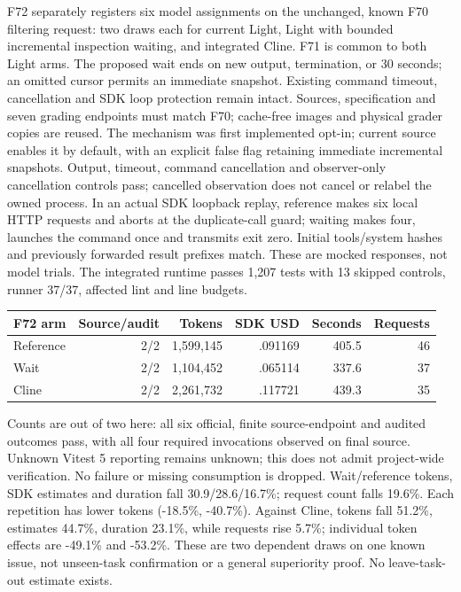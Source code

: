 \documentclass[11pt,a4paper]{article}
\begin{document}
F72 separately registers six model assignments on the unchanged, known F70
filtering request: two draws each for current Light, Light with bounded incremental
inspection waiting, and integrated Cline. F71 is common to both Light arms.
The proposed wait ends on new output, termination, or 30 seconds; an omitted
cursor permits an immediate snapshot. Existing command timeout, cancellation and
SDK loop protection remain intact. Sources, specification and seven grading
endpoints must match F70; cache-free images and physical grader copies are reused.
The mechanism was first implemented opt-in; current source enables it by default,
with an explicit false flag retaining immediate incremental snapshots. Output,
timeout, command cancellation and
observer-only cancellation controls pass; cancelled observation does not cancel
or relabel the owned process. In an actual SDK loopback replay, reference makes
six local HTTP requests and aborts at the duplicate-call guard; waiting makes
four, launches the command once and transmits exit zero. Initial tools/system
hashes and previously forwarded result prefixes match. These are mocked responses,
not model trials. The integrated runtime passes 1,207 tests with 13 skipped controls,
runner 37/37, affected lint and line budgets.
\begin{center}\small
\begin{tabular}{lrrrrr}\toprule
F72 arm & Source/audit & Tokens & SDK USD & Seconds & Requests \\\midrule
Reference & 2/2 & 1,599,145 & .091169 & 405.5 & 46 \\
Wait & 2/2 & 1,104,452 & .065114 & 337.6 & 37 \\
Cline & 2/2 & 2,261,732 & .117721 & 439.3 & 35 \\\bottomrule
\end{tabular}\end{center}
Counts are out of two here: all six official, finite source-endpoint and audited
outcomes pass, with all four required invocations observed on final source.
Unknown Vitest 5 reporting remains unknown; this does not admit project-wide
verification. No failure or missing consumption is dropped.
Wait/reference tokens, SDK estimates and duration fall 30.9/28.6/16.7\%; request
count falls 19.6\%. Each repetition has lower tokens (-18.5\%, -40.7\%). Against
Cline, tokens fall 51.2\%, estimates 44.7\%, duration 23.1\%, while requests rise
5.7\%; individual token effects are -49.1\% and -53.2\%. These are two dependent
draws on one known issue, not unseen-task confirmation or a general superiority
proof. No leave-task-out estimate exists.
\end{document}
